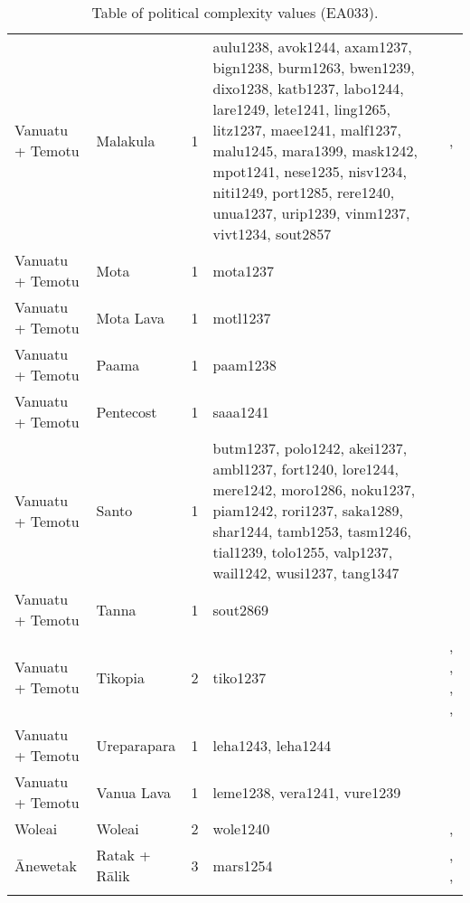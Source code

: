 \begin{longtable}{p{4.5cm}p{2cm}p{2cm}p{2cm}p{4cm}}
  Vanuatu + Temotu & Malakula & 1 & aulu1238, avok1244, axam1237, bign1238, burm1263, bwen1239, dixo1238, katb1237, labo1244, lare1249, lete1241, ling1265, litz1237, maee1241, malf1237, malu1245, mara1399, mask1242, mpot1241, nese1235, nisv1234, niti1249, port1285, rere1240, unua1237, urip1239, vinm1237, vivt1234, sout2857 & \citet{bonnemaison1996power}, \citet{deacon1934} \\ 
  Vanuatu + Temotu & Mota & 1 & mota1237 & \citet{bonnemaison1996power} \\ 
  Vanuatu + Temotu & Mota Lava & 1 & motl1237 & \citet{bonnemaison1996power} \\ 
  Vanuatu + Temotu & Paama & 1 & paam1238 & \citet{bonnemaison1996power} \\ 
  Vanuatu + Temotu & Pentecost & 1 & saaa1241 & \citet{lane1956} \\ 
  Vanuatu + Temotu & Santo & 1 & butm1237, polo1242, akei1237, ambl1237, fort1240, lore1244, mere1242, moro1286, noku1237, piam1242, rori1237, saka1289, shar1244, tamb1253, tasm1246, tial1239, tolo1255, valp1237, wail1242, wusi1237, tang1347 & \citet{bonnemaison1996power} \\ 
  Vanuatu + Temotu & Tanna & 1 & sout2869 & \citet{lindstroem1991} \\ 
  Vanuatu + Temotu & Tikopia & 2 & tiko1237 & \citet{kirch1994wet}, \citet{sahlins1958social}, \citet{firth1939primitive}, \citet{firth1959social}, \citet{firth1991} \\ 
  Vanuatu + Temotu & Ureparapara & 1 & leha1243, leha1244 & \citet{bonnemaison1996power} \\ 
  Vanuatu + Temotu & Vanua Lava & 1 & leme1238, vera1241, vure1239 & \citet{bonnemaison1996power} \\ 
  Woleai & Woleai & 2 & wole1240 & \citet{alkire1991woleai}, \citet{burrowsandspiro1953} \\ 
  Ānewetak & Ratak + Rālik & 3 & mars1254 & \citet{carruci1991marshall}, \citet{erdland1914}, \citet{williamson_1982} \\ 
   \bottomrule
\caption{Table of political complexity values (EA033).} 
\label{appendix_pol_complex_xtable}
\end{longtable}
